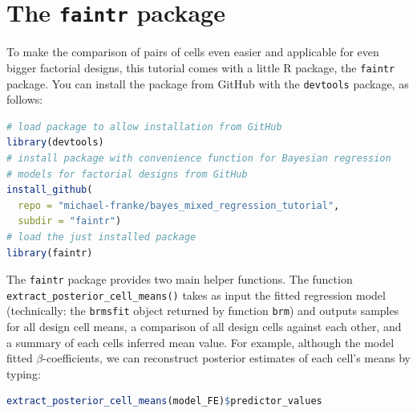 \documentclass[nobib]{tufte-handout}
\begin{document}
\section{The \texttt{faintr} package}

To make the comparison of pairs of cells even easier and applicable for even bigger factorial designs, this tutorial comes with a little R package, the \texttt{faintr} package.
%
%
You can install the package from GitHub with the \texttt{devtools} package, as follows:

\medskip 

\begin{minipage}[]{1.3\textwidth}
\begin{lstlisting}[language=R]
# load package to allow installation from GitHub
library(devtools)
# install package with convenience function for Bayesian regression 
# models for factorial designs from GitHub
install_github(
  repo = "michael-franke/bayes_mixed_regression_tutorial", 
  subdir = "faintr")
# load the just installed package
library(faintr)
\end{lstlisting}
\end{minipage}

The \texttt{faintr} package provides two main helper functions.
%
%
The function \texttt{extract\_posterior\_cell\_means()}
takes as input the fitted regression model (technically: the \texttt{brmsfit} object returned
by function \texttt{brm}) and outputs samples for all design cell means, a comparison of all
design cells against each other, and a summary of each cells inferred mean value.
For example, although the model fitted $\beta$-coefficients, we can reconstruct posterior estimates of each cell's means by typing:

\begin{minipage}[]{1.3\textwidth}
\begin{lstlisting}[language=R]
extract_posterior_cell_means(model_FE)$predictor_values
\end{lstlisting}
\end{minipage}

\vspace*{-0.5cm}
\end{document}

